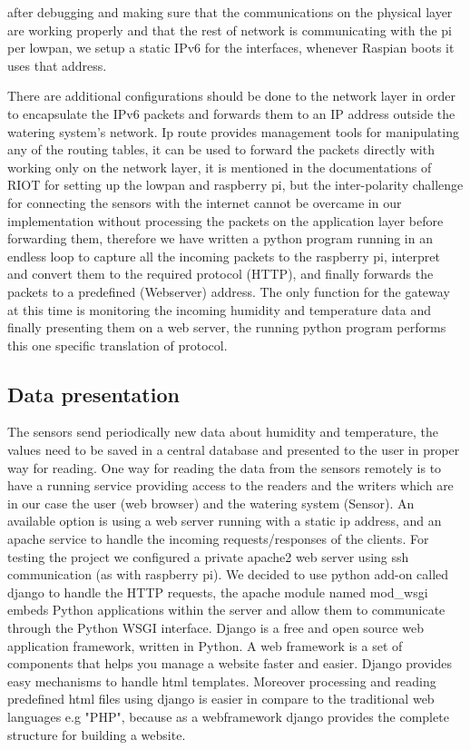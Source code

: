 \documentclass[11pt,paper=a4,parskip=half]{scrartcl}
\begin{document}
 after debugging and making sure that the communications on the physical layer are working properly and that the rest of network is communicating with the pi per lowpan, we setup a static IPv6 for the interfaces, whenever Raspian boots it uses that address. 
 
 There are additional configurations should be done to the network layer in order to encapsulate the IPv6 packets and forwards them to an IP address outside the watering system's network. Ip route provides management tools for manipulating any of the routing tables, it can be used to forward the packets directly with working only on the network layer, it is mentioned in the documentations of RIOT for setting up the lowpan and raspberry pi, but the inter-polarity challenge for connecting the sensors with the internet cannot be overcame in our implementation without processing the packets on the application layer before forwarding them, therefore we have written a python program running in an endless loop to capture all the incoming packets to the raspberry pi, interpret and convert them to the required protocol (HTTP), and finally forwards the packets to a predefined (Webserver) address. The only function for the gateway at this time is monitoring the incoming humidity and temperature data and finally presenting them on a web server, the running python program performs this one specific translation of protocol.

\subsection{Data presentation}

The sensors send periodically new data about humidity and temperature, the values need to be saved in a central database and presented to the user in proper way for reading.
One way for reading the data from the sensors remotely is to have a running service providing access to the readers and the writers which are in our case the user (web browser) and the watering system (Sensor). An available option is using a web server running with a static ip address, and an apache service to handle the incoming requests/responses of the clients. For testing the project we configured a private apache2 web server using ssh communication (as with raspberry pi). We decided to use python add-on called django to handle the HTTP requests, the apache module named mod\_wsgi embeds Python applications within the server and allow them to communicate through the Python WSGI interface. Django is a free and open source web application framework, written in Python. A web framework is a set of components that helps you manage a website faster and easier. Django provides easy mechanisms to handle html templates. Moreover processing and reading predefined html files using django is easier in compare to the traditional web languages e.g "PHP", because as a webframework django provides the complete structure for building a website.  
\end{document}
